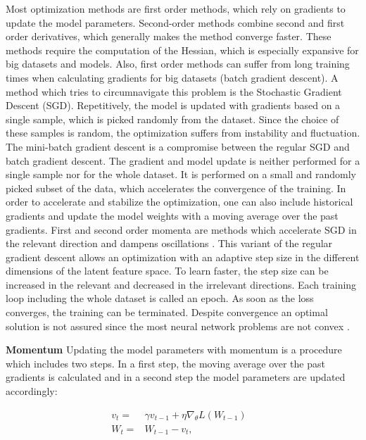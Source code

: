Most optimization methods are first order methods, which rely on gradients to update the model parameters. Second-order methods combine second and first order derivatives, which generally makes the method converge faster. These methods require the computation of the Hessian, which is especially expansive for big datasets and models. Also, first order methods can suffer from long training times when calculating gradients for big datasets (batch gradient descent). A method which tries to circumnavigate this problem is the Stochastic Gradient Descent (SGD). Repetitively, the model is updated with gradients based on a single sample, which is picked randomly from the dataset. Since the choice of these samples is random, the optimization suffers from instability and fluctuation. The mini-batch gradient descent is a compromise between the regular SGD and batch gradient descent. The gradient and model update is neither performed for a single sample nor for the whole dataset. It is performed on a small and randomly picked subset of the data, which accelerates the convergence of the training.
In order to accelerate and stabilize the optimization, one can also include historical gradients and update the model weights with a moving average over the past gradients. First and second order momenta are methods which accelerate SGD in the relevant direction and dampens oscillations \cite{ShilohPerl2020}. This variant of the regular gradient descent allows an optimization with an adaptive step size in the different dimensions of the latent feature space. To learn faster, the step size can be increased in the relevant and decreased in the irrelevant directions. Each training loop including the whole dataset is called an epoch. As soon as the loss converges, the training can be terminated. Despite convergence an optimal solution is not assured since the most neural network problems are not convex \cite{ShilohPerl2020}.\newline\newline

\textbf{Momentum}
Updating the model parameters with momentum is a procedure which includes two steps. In a first step, the moving average over the past gradients is calculated and in a second step the model parameters are updated accordingly:

\begin{equation}
  \begin{aligned}
      v_{t} = & \gamma v_{t-1} +  \eta \nabla_{\theta}L(W_{t-1}) &\\
      W_{t} = &W_{t-1} - v_{t},
      \label{eqn:momentum}
  \end{aligned}
\end{equation}

